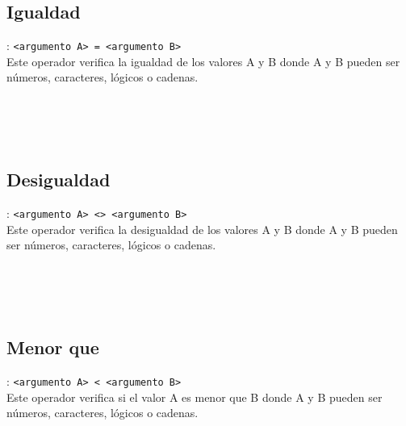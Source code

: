       \subsection*{Igualdad}: \texttt{<argumento A>~= <argumento B>}\\
      Este operador verifica la igualdad de los valores A y B donde A y B pueden ser números, caracteres, lógicos o cadenas.
      
      \begin{fxcode}
         \\
         \\
         \\
      \end{fxcode}
      
      \subsection*{Desigualdad}: \texttt{<argumento A>~<>~<argumento B>}\\
      Este operador verifica la desigualdad de los valores A y B donde A y B pueden ser números, caracteres, lógicos o cadenas.
      
      \begin{fxcode}
         \\
         \\
         \\
      \end{fxcode}
      
      \subsection*{Menor que}: \texttt{<argumento A>~\texttt{<} <argumento B>}\\
      Este operador verifica si el valor A es menor que B donde A y B pueden ser números, caracteres, lógicos o cadenas.
      
      \begin{fxcode}
         \\
         \\
         \\
      \end{fxcode}
      
